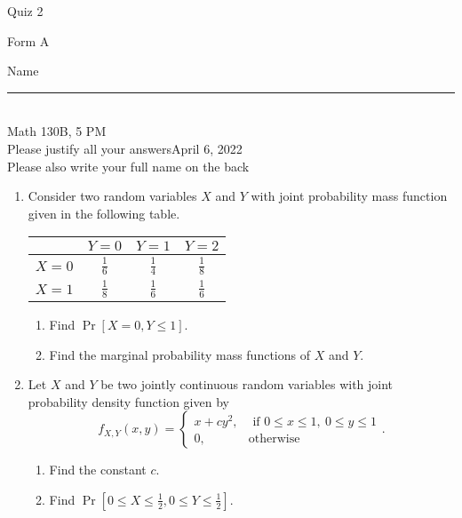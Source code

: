 \documentclass[12pt]{article}
\begin{document}
\begin{flushleft} 
\centerline{\LARGE{Quiz 2}} 
\vspace{5 mm}
{Form A}\hfill  
{Name \rule {2 in}{0.01in}}\\
Math 130B, 5 PM
\\
{Please justify all your answers}\hfill {April 6, 2022}
\\
{Please also write your full name on the back} 

\medskip
\end{flushleft}

\begin{enumerate}
	\item Consider two random variables $X$ and $Y$ with joint probability mass function given in the following table.
	\begin{center}
		\begin{tabular}{|c||c|c|c|}
			\hline
			& $Y=0$ & $Y=1$ & $Y=2$\\
			\hline\hline
			$X=0$ & $\frac{1}{6}$ & $\frac{1}{4}$ & $\frac{1}{8}$\\
			\hline
			$X=1$ & $\frac{1}{8}$ & $\frac{1}{6}$ & $\frac{1}{6}$\\
			\hline
		\end{tabular}
	\end{center}
	\begin{enumerate}
		\item Find $\Pr[X=0, Y\leq 1]$.
		\vfill

		\item Find the marginal probability mass functions of $X$ and $Y$.


	\end{enumerate}
	\vfill

	\item Let $X$ and $Y$ be two jointly continuous random variables with joint probability density function given by
	\[
	f_{X,Y}(x,y) = \begin{cases}
		x + cy^2, & \text{ if }0\leq x \leq 1,\ 0\leq y\leq 1\\
		0, & \text{otherwise}
	\end{cases}.
	\]
	\begin{enumerate}
		\item Find the constant $c$.
		\vfill

		\item Find $\Pr[0\leq X\leq \frac{1}{2}, 0\leq Y\leq \frac{1}{2}]$.
	\end{enumerate}

	\vfill\null
\end{enumerate}
\pagebreak
\end{document}
